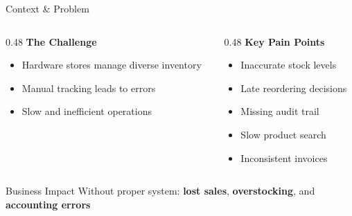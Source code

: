 \documentclass[aspectratio=169,11pt]{beamer}
\begin{document}
\begin{frame}{Context \& Problem}

\begin{columns}[T]
  \begin{column}{0.48\textwidth}
    \textbf{\textcolor{accent1}{The Challenge}}
    \begin{itemize}
      \item Hardware stores manage \alert{diverse inventory}
      \item Manual tracking leads to errors
      \item Slow and inefficient operations
    \end{itemize}
  \end{column}
  
  \begin{column}{0.48\textwidth}
    \textbf{\textcolor{accent1}{Key Pain Points}}
    \begin{itemize}
      \item \textcolor{accent2}{Inaccurate} stock levels
      \item \alert{Late} reordering decisions
      \item Missing \textcolor{accent3}{audit trail}
      \item Slow product search
      \item Inconsistent invoices
    \end{itemize}
  \end{column}
\end{columns}

\vspace{0.8cm}

\begin{block}{Business Impact}
  Without proper system: \textbf{lost sales}, \textbf{overstocking}, and \textbf{accounting errors}
\end{block}

\end{frame}
\end{document}
